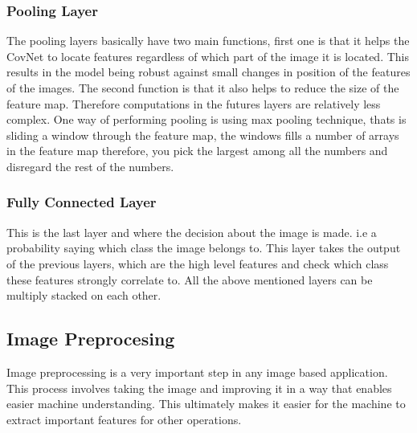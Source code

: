 \documentclass[12pt, a4paper,oneside]{report}
\begin{document}
\subsubsection{Pooling Layer}
The pooling layers basically have two main functions, first one is that it helps the CovNet to locate features regardless of which part of the image it is located. This results in the model being robust against small changes in position of the features of the images. The second function is that it also helps to reduce the size of the feature map. Therefore computations in the futures layers are relatively less complex. One way of performing pooling is using max pooling technique, thats is sliding a window through the feature map, the windows fills a number of arrays in the feature map therefore, you pick the largest among all the numbers and disregard the rest of the numbers. 

\subsubsection{Fully Connected Layer}
This is the last layer and where the decision about the image is made. i.e a probability saying which class the image belongs to. This layer takes the output of the previous layers, which are the high level features and check which class these features strongly correlate to. All the above mentioned layers can be multiply stacked 
on each other.


\subsection{Image Preprocesing}
Image preprocessing is a very important step in any image based application. This process involves taking the image and improving it in a way that enables easier machine understanding. This ultimately makes it easier for the machine to extract important features for other operations. 





\end{document}
